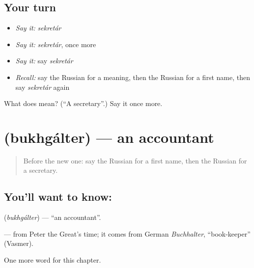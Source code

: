 \subsection*{Your turn}
\begin{itemize}
\raggedright
  \item \emph{Say it:} \emph{sekretár}
  \item \emph{Say it:} \emph{sekretár}, once more
  \item \emph{Say it:} say \emph{sekretár}
  \item \emph{Recall:} say the Russian for a meaning, then the Russian for a first name, then say \emph{sekretár} again
\end{itemize}

\begin{tcolorbox}[breakable,colback=teal!4,colframe=teal!35!black,title={Before you move on}]
What does  mean? (\textquotedblleft{}A secretary\textquotedblright{}.) Say it once more.
\end{tcolorbox}
\section[\texorpdfstring{\ru{бухгалтер} (bukhgálter)}{бухгалтер (bukhgálter)}]{ (bukhgálter) — an accountant}

\label{lesson:RU-C229-bukhgalter}



\begin{quote}
Before the new one: say the Russian for a first name, then the Russian for a secretary.
\end{quote}

\subsection*{You'll want to know: }
\textbf{} (\emph{bukhgálter}) — \textquotedblleft{}an accountant\textquotedblright{}.

\begin{cousinweb}
\textbf{} — from Peter the Great's time; it comes from German \emph{Buchhalter}, \textquotedblleft{}book-keeper\textquotedblright{} (Vasmer).
\end{cousinweb}

\begin{grammarlens}[title={What you've built}]
One more word for this chapter.
\end{grammarlens}


